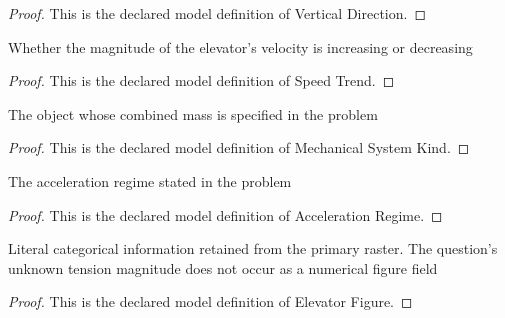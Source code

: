 \begin{proof}
  This is the declared model definition of Vertical Direction.
\end{proof}
\begin{definition}
  \label{def:physics:phyx-mini-0802:phyxminiproblems-problemphyxmini0802-speedtrend}
  Whether the magnitude of the elevator's velocity is increasing or decreasing
\end{definition}
\begin{proof}
  This is the declared model definition of Speed Trend.
\end{proof}
\begin{definition}
  \label{def:physics:phyx-mini-0802:phyxminiproblems-problemphyxmini0802-mechanicalsystemkind}
  The object whose combined mass is specified in the problem
\end{definition}
\begin{proof}
  This is the declared model definition of Mechanical System Kind.
\end{proof}
\begin{definition}
  \label{def:physics:phyx-mini-0802:phyxminiproblems-problemphyxmini0802-accelerationregime}
  The acceleration regime stated in the problem
\end{definition}
\begin{proof}
  This is the declared model definition of Acceleration Regime.
\end{proof}
\begin{definition}
  \label{def:physics:phyx-mini-0802:phyxminiproblems-problemphyxmini0802-elevatorfigure}
  Literal categorical information retained from the primary raster. The question's unknown tension magnitude does not occur as a numerical figure field
\end{definition}
\begin{proof}
  This is the declared model definition of Elevator Figure.
\end{proof}
